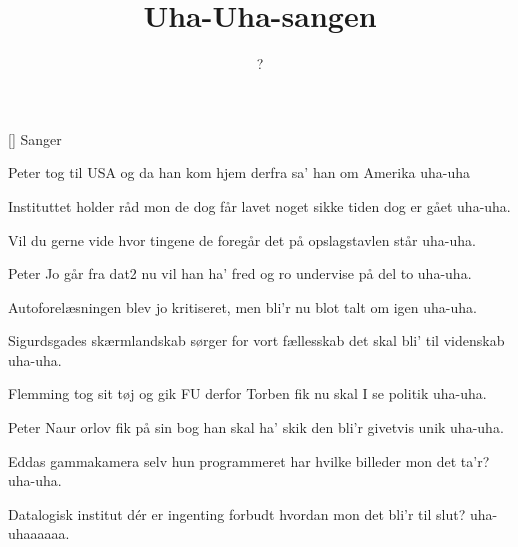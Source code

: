 \documentclass[a4paper,11pt]{article}
\title{Uha-Uha-sangen}
\author{?}
\begin{document}
\maketitle

\begin{roles}  
[] Sanger
\end{roles}

\begin{song}
Peter tog til USA
og da han kom hjem derfra
sa' han om Amerika
uha-uha

Instituttet holder råd
mon de dog får lavet noget
sikke tiden dog er gået
uha-uha.

Vil du gerne vide hvor
tingene de foregår
det på opslagstavlen står
uha-uha.

Peter Jo går fra dat2
nu vil han ha' fred og ro
undervise på del to
uha-uha.

Autoforelæsningen
blev jo kritiseret, men
bli'r nu blot talt om igen
uha-uha.

Sigurdsgades skærmlandskab
sørger for vort fællesskab
det skal bli' til videnskab
uha-uha.

Flemming tog sit tøj og gik
FU derfor Torben fik
nu skal I se politik
uha-uha.

Peter Naur orlov fik
på sin bog han skal ha' skik
den bli'r givetvis unik
uha-uha.

Eddas gammakamera
selv hun programmeret har
hvilke billeder mon det ta'r?
uha-uha.

Datalogisk institut
dér er ingenting forbudt
hvordan mon det bli'r til slut?
uha-uhaaaaaa.
\end{song}
\end{document}

